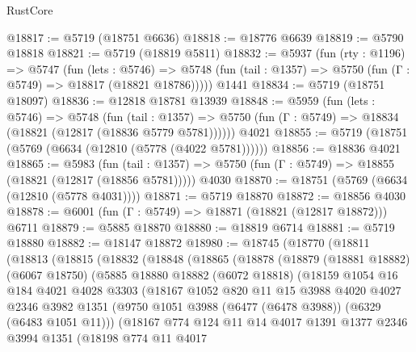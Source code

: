 \begin{lexlean}{RustCore}
\begin{coremodule}
@18817 := @5719 (@18751 @6636)
@18818 := @18776 @6639
@18819 := @5790 @18818
@18821 := @5719 (@18819 @5811)
@18832 := @5937
    (fun (rty : @1196) =>
    @5747
      (fun (lets : @5746) =>
      @5748 (fun (tail : @1357) => @5750 (fun (Γ : @5749) => @18817 (@18821 @18786)))))
    @1441
@18834 := @5719 (@18751 @18097)
@18836 := @12818 @18781 @13939
@18848 := @5959
    (fun (lets : @5746) =>
    @5748
      (fun (tail : @1357) =>
      @5750 (fun (Γ : @5749) => @18834 (@18821 (@12817 (@18836 @5779 @5781))))))
    @4021
@18855 := @5719 (@18751 (@5769 (@6634 (@12810 (@5778 (@4022 @5781))))))
@18856 := @18836 @4021
@18865 := @5983
    (fun (tail : @1357) => @5750 (fun (Γ : @5749) => @18855 (@18821 (@12817 (@18856 @5781)))))
    @4030
@18870 := @18751 (@5769 (@6634 (@12810 (@5778 @4031))))
@18871 := @5719 @18870
@18872 := @18856 @4030
@18878 := @6001 (fun (Γ : @5749) => @18871 (@18821 (@12817 @18872))) @6711
@18879 := @5885 @18870
@18880 := @18819 @6714
@18881 := @5719 @18880
@18882 := @18147 @18872
@18980 := @18745
    (@18770
      (@18811
        (@18813
          (@18815
            (@18832
              (@18848
                (@18865
                  (@18878
                    (@18879
                      (@18881 @18882)
                      (@6067 @18750)
                      (@5885
                        @18880
                        @18882
                        (@6072 @18818)
                        (@18159
                          @1054
                          @16
                          @184
                          @4021
                          @4028
                          @3303
                          (@18167
                            @1052
                            @820
                            @11
                            @15
                            @3988
                            @4020
                            @4027
                            @2346
                            @3982
                            @1351
                            (@9750 @1051 @3988 (@6477 (@6478 @3988)) (@6329 (@6483 @1051 @11)))
                            (@18167
                              @774
                              @124
                              @11
                              @14
                              @4017
                              @1391
                              @1377
                              @2346
                              @3994
                              @1351
                              (@18198
                                @774
                                @11
                                @4017

\end{coremodule}
\end{lexlean}
